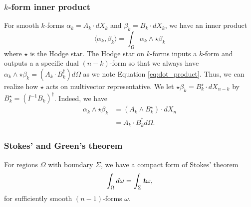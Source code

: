 \subsubsection{$k$-form inner product}
For smooth $k$-forms $\alpha_k = A_k \cdot dX_k$ and $\beta_k = B_k \cdot dX_k$, we have an inner product 
\[
\langle \alpha_k, \beta_k \rangle = \int_\Omega \alpha_k \wedge \star \beta_k 
\]
where $\star$ is the Hodge star. The Hodge star on $k$-forms inputs a $k$-form and outputs a a specific dual $(n-k)$-form so that we always have $\alpha_k \wedge \star \beta_k  = (A_k\cdot B_k^\dagger)d\Omega$ as we note Equation \ref{eq:dot_product}. Thus, we can realize how $\star$ acts on multivector representative. We let $\star \beta_k = B_k^\star \cdot dX_{n-k}$ by $B_k^\star = (I^{-1} B_k)^\dagger$.  Indeed, we have
\begin{align*}
    \alpha_k \wedge \star \beta_k &= (A_k \wedge B_k^\star) \cdot dX_n\\
    &= A_k \cdot B_k^\dagger d\Omega.
\end{align*}

\subsubsection{Stokes' and Green's theorem}

For regions $\Omega$ with boundary $\Sigma$, we have a compact form of Stokes' theorem
\[
\int_\Omega d \omega = \int_\Sigma \boldsymbol{t} \omega,
\]
for sufficiently smooth $(n-1)$-forms $\omega$.


